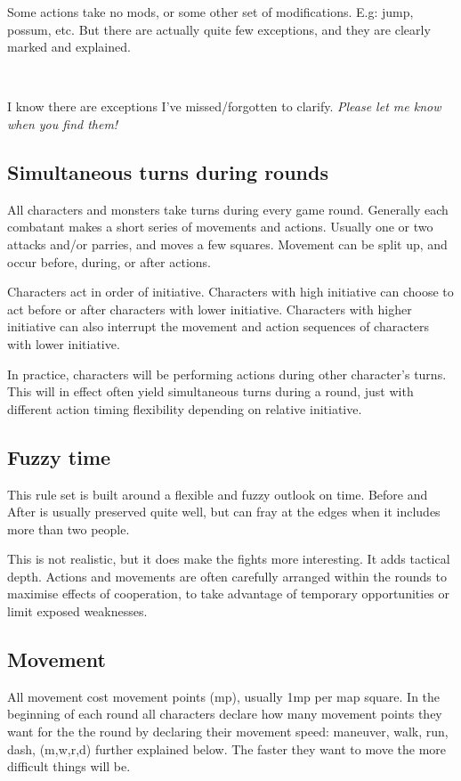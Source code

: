 Some actions take no mods, or some other set of modifications. E.g: jump, possum, etc. But there are actually quite few exceptions, and they are clearly marked and explained.

\

\todo I know there are exceptions I've missed/forgotten to clarify. \emph{Please let me know when you find them!}


\subsection*{Simultaneous turns during rounds}
All characters and monsters take turns during every game round. Generally each combatant makes a short series of movements and actions. Usually one or two attacks and/or parries, and moves a few squares. Movement can be split up, and occur before, during, or after actions.

Characters act in order of initiative. Characters with high initiative can choose to act before or after characters with lower initiative. Characters with higher initiative can also interrupt the movement and action sequences of characters with lower initiative.

In practice, characters will be performing actions during other character's turns. This will in effect often yield simultaneous turns during a round, just with different action timing flexibility depending on relative initiative.


\subsection*{Fuzzy time}
This rule set is built around a flexible and fuzzy outlook on time. Before and After is usually preserved quite well, but can fray at the edges when it includes more than two people.

This is not realistic, but it does make the fights more interesting. It adds tactical depth. Actions and movements are often carefully arranged within the rounds to maximise effects of cooperation, to take advantage of temporary opportunities or limit exposed weaknesses.


\subsection*{Movement}
All movement cost movement points (mp), usually 1mp per map square. In the beginning of each round all characters declare how many movement points they want for the the round by declaring their movement speed: maneuver, walk, run, dash, (m,w,r,d) further explained below. The faster they want to move the more difficult things will be.

